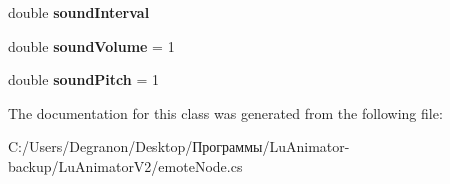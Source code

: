 \begin{DoxyCompactItemize}
\item 
double {\bfseries sound\+Interval}\hypertarget{class_lu_animator_v2_1_1emote_node_a85d34354ad778f8986aa1ca31453e63e}{}\label{class_lu_animator_v2_1_1emote_node_a85d34354ad778f8986aa1ca31453e63e}

\item 
double {\bfseries sound\+Volume} = 1\hypertarget{class_lu_animator_v2_1_1emote_node_a1c7b5201794826c4d7741086446d7d3b}{}\label{class_lu_animator_v2_1_1emote_node_a1c7b5201794826c4d7741086446d7d3b}

\item 
double {\bfseries sound\+Pitch} = 1\hypertarget{class_lu_animator_v2_1_1emote_node_a1930b66a157861ad383c451cd2087d02}{}\label{class_lu_animator_v2_1_1emote_node_a1930b66a157861ad383c451cd2087d02}

\end{DoxyCompactItemize}


The documentation for this class was generated from the following file\+:\begin{DoxyCompactItemize}
\item 
C\+:/\+Users/\+Degranon/\+Desktop/Программы/\+Lu\+Animator-\/backup/\+Lu\+Animator\+V2/emote\+Node.\+cs\end{DoxyCompactItemize}
